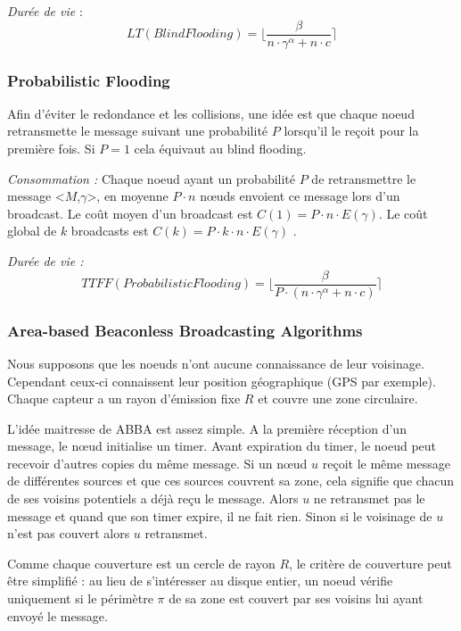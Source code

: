 \emph{Durée de vie} :   $$LT(Blind Flooding)=\lfloor \frac{\beta}{n\cdot \gamma^\alpha +  n\cdot c} \rceil$$



\subsubsection{Probabilistic Flooding}
Afin d'éviter le redondance et les collisions, une idée est que chaque noeud retransmette le message suivant une probabilité $P$ lorsqu'il le reçoit pour la première fois. Si $P=1$ cela équivaut au blind flooding.

\emph{Consommation :} Chaque noeud ayant un probabilité $P$ de retransmettre le message <$M$,$\gamma$>, en moyenne $P\cdot n$ nœuds envoient ce message lors d'un broadcast.
Le coût moyen d'un broadcast est $C(1) = P\cdot n \cdot E( \gamma ) $. Le coût global de $k$ broadcasts est $C(k) = P\cdot k\cdot n \cdot E( \gamma ) $ .

\emph{Durée de vie :} $$TTFF(Probabilistic Flooding)=\lfloor \frac{\beta}{P \cdot (n\cdot \gamma^\alpha +  n\cdot c)} \rceil$$


\subsubsection{Area-based Beaconless Broadcasting Algorithms \cite{Ovalle2006}}
Nous supposons que les noeuds n'ont aucune connaissance de leur voisinage. Cependant ceux-ci connaissent leur position géographique (GPS par exemple). Chaque capteur a un rayon d'émission fixe $R$ et couvre une zone circulaire.

L'idée maitresse de ABBA est assez simple. A la première réception d'un message, le nœud initialise un timer. Avant expiration du timer, le noeud peut recevoir d'autres copies du même message. Si un nœud $u$ reçoit le même message de différentes sources et que ces sources couvrent sa zone, cela signifie que chacun de ses voisins potentiels a déjà reçu le message. Alors $u$ ne retransmet pas le message et quand que son timer expire, il ne fait rien. Sinon si le voisinage de $u$ n'est pas couvert alors $u$ retransmet.

Comme chaque couverture est un cercle de rayon $R$, le critère de couverture peut être simplifié : au lieu de s'intéresser au disque entier, un noeud vérifie uniquement si le périmètre $\pi$ de sa zone est couvert par ses voisins lui ayant envoyé le message.


